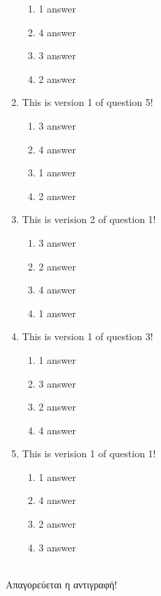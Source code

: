 \documentclass[a4paper, 11pt]{article}
\begin{document}
\begin{enumerate}
\begin{enumerate}[(1)]
    \item 1 answer
    \item 4 answer
    \item 3 answer
    \item 2 answer
\end{enumerate}
\item This is version 1 of question 5!
\begin{enumerate}[(1)]
    \item 3 answer
    \item 4 answer
    \item 1 answer
    \item 2 answer
\end{enumerate}
\item This is verision 2 of question 1!
\begin{enumerate}[(1)]
    \item 3 answer
    \item 2 answer
    \item 4 answer
    \item 1 answer
\end{enumerate}
\item This is version 1 of question 3!
\begin{enumerate}[(1)]
    \item 1 answer
    \item 3 answer
    \item 2 answer
    \item 4 answer
\end{enumerate}
\item This is verision 1 of question 1!
\begin{enumerate}[(1)]
    \item 1 answer
    \item 4 answer
    \item 2 answer
    \item 3 answer
\end{enumerate}
\end{enumerate}
\hrulefill \\ 

Απαγορεύεται η αντιγραφή! 

\newpage 
\end{document}
